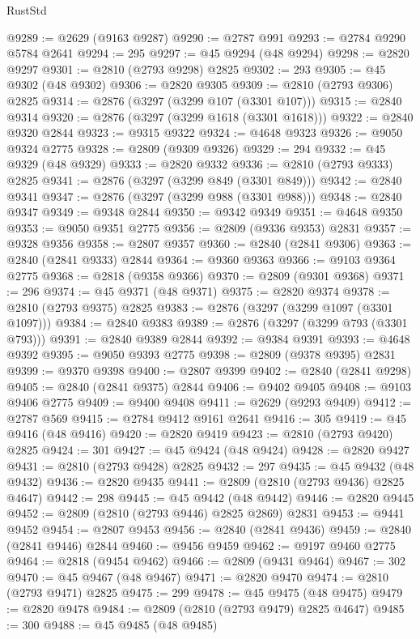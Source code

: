\begin{lexlean}{RustStd}
\begin{coremodule}
@9289 := @2629 (@9163 @9287)
@9290 := @2787 @991
@9293 := @2784 @9290 @5784 @2641
@9294 := 295
@9297 := @45 @9294 (@48 @9294)
@9298 := @2820 @9297
@9301 := @2810 (@2793 @9298) @2825
@9302 := 293
@9305 := @45 @9302 (@48 @9302)
@9306 := @2820 @9305
@9309 := @2810 (@2793 @9306) @2825
@9314 := @2876 (@3297 (@3299 @107 (@3301 @107)))
@9315 := @2840 @9314
@9320 := @2876 (@3297 (@3299 @1618 (@3301 @1618)))
@9322 := @2840 @9320 @2844
@9323 := @9315 @9322
@9324 := @4648 @9323
@9326 := @9050 @9324 @2775
@9328 := @2809 (@9309 @9326)
@9329 := 294
@9332 := @45 @9329 (@48 @9329)
@9333 := @2820 @9332
@9336 := @2810 (@2793 @9333) @2825
@9341 := @2876 (@3297 (@3299 @849 (@3301 @849)))
@9342 := @2840 @9341
@9347 := @2876 (@3297 (@3299 @988 (@3301 @988)))
@9348 := @2840 @9347
@9349 := @9348 @2844
@9350 := @9342 @9349
@9351 := @4648 @9350
@9353 := @9050 @9351 @2775
@9356 := @2809 (@9336 @9353) @2831
@9357 := @9328 @9356
@9358 := @2807 @9357
@9360 := @2840 (@2841 @9306)
@9363 := @2840 (@2841 @9333) @2844
@9364 := @9360 @9363
@9366 := @9103 @9364 @2775
@9368 := @2818 (@9358 @9366)
@9370 := @2809 (@9301 @9368)
@9371 := 296
@9374 := @45 @9371 (@48 @9371)
@9375 := @2820 @9374
@9378 := @2810 (@2793 @9375) @2825
@9383 := @2876 (@3297 (@3299 @1097 (@3301 @1097)))
@9384 := @2840 @9383
@9389 := @2876 (@3297 (@3299 @793 (@3301 @793)))
@9391 := @2840 @9389 @2844
@9392 := @9384 @9391
@9393 := @4648 @9392
@9395 := @9050 @9393 @2775
@9398 := @2809 (@9378 @9395) @2831
@9399 := @9370 @9398
@9400 := @2807 @9399
@9402 := @2840 (@2841 @9298)
@9405 := @2840 (@2841 @9375) @2844
@9406 := @9402 @9405
@9408 := @9103 @9406 @2775
@9409 := @9400 @9408
@9411 := @2629 (@9293 @9409)
@9412 := @2787 @569
@9415 := @2784 @9412 @9161 @2641
@9416 := 305
@9419 := @45 @9416 (@48 @9416)
@9420 := @2820 @9419
@9423 := @2810 (@2793 @9420) @2825
@9424 := 301
@9427 := @45 @9424 (@48 @9424)
@9428 := @2820 @9427
@9431 := @2810 (@2793 @9428) @2825
@9432 := 297
@9435 := @45 @9432 (@48 @9432)
@9436 := @2820 @9435
@9441 := @2809 (@2810 (@2793 @9436) @2825 @4647)
@9442 := 298
@9445 := @45 @9442 (@48 @9442)
@9446 := @2820 @9445
@9452 := @2809 (@2810 (@2793 @9446) @2825 @2869) @2831
@9453 := @9441 @9452
@9454 := @2807 @9453
@9456 := @2840 (@2841 @9436)
@9459 := @2840 (@2841 @9446) @2844
@9460 := @9456 @9459
@9462 := @9197 @9460 @2775
@9464 := @2818 (@9454 @9462)
@9466 := @2809 (@9431 @9464)
@9467 := 302
@9470 := @45 @9467 (@48 @9467)
@9471 := @2820 @9470
@9474 := @2810 (@2793 @9471) @2825
@9475 := 299
@9478 := @45 @9475 (@48 @9475)
@9479 := @2820 @9478
@9484 := @2809 (@2810 (@2793 @9479) @2825 @4647)
@9485 := 300
@9488 := @45 @9485 (@48 @9485)

\end{coremodule}
\end{lexlean}
